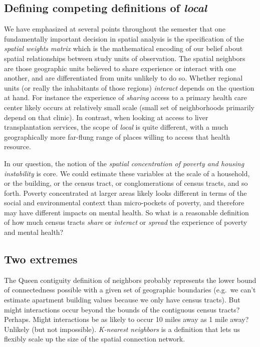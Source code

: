 \documentclass[
]{book}
\begin{document}
\hypertarget{defining-competing-definitions-of-local}{%
\subsection{\texorpdfstring{Defining competing definitions of \emph{local}}{Defining competing definitions of local}}\label{defining-competing-definitions-of-local}}

We have emphasized at several points throughout the semester that one fundamentally important decision in spatial analysis is the specification of the \emph{spatial weights matrix} which is the mathematical encoding of our belief about spatial relationships between study units of observation. The spatial neighbors are those geographic units believed to share experience or interact with one another, and are differentiated from units unlikely to do so. Whether regional units (or really the inhabitants of those regions) \emph{interact} depends on the question at hand. For instance the experience of \emph{sharing} access to a primary health care center likely occurs at relatively small scale (small set of neighborhoods primarily depend on that clinic). In contrast, when looking at access to liver transplantation services, the scope of \emph{local} is quite different, with a much geographically more far-flung range of places willing to access that health resource.

In our question, the notion of the \emph{spatial concentration of poverty and housing instability} is core. We could estimate these variables at the scale of a household, or the building, or the census tract, or conglomerations of census tracts, and so forth. Poverty concentrated at larger areas likely looks different in terms of the social and environmental context than micro-pockets of poverty, and therefore may have different impacts on mental health. So what is a reasonable definition of how much census tracts \emph{share} or \emph{interact} or \emph{spread} the experience of poverty and mental health?

\hypertarget{two-extremes}{%
\subsection{Two extremes}\label{two-extremes}}

The Queen contiguity definition of neighbors probably represents the lower bound of connectedness possible with a given set of geographic boundaries (e.g.~we can't estimate apartment building values because we only have census tracts). But might interactions occur beyond the bounds of the contiguous census tracts? Perhaps. Might interactions be as likely to occur 10 miles away as 1 mile away? Unlikely (but not impossible). \emph{K-nearest neighbors} is a definition that lets us flexibly scale up the size of the spatial connection network.
\end{document}
